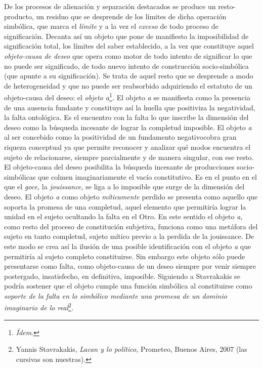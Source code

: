 De los procesos de alienación y separación destacados se produce un resto-producto, un residuo que se desprende de los límites de dicha operación simbólica, que marca el \emph{límite} y a la vez el \emph{exceso} de todo proceso de significación. Decanta así un objeto que pone de manifiesto la imposibilidad de significación total, los límites del saber establecido, a la vez que constituye aquel \emph{objeto-causa de deseo} que opera como motor de todo intento de significar lo que no puede ser significado, de todo nuevo intento de construcción socio-simbólica (que apunte a su significación). Se trata de aquel resto que se desprende a modo de heterogeneidad y que no puede ser reabsorbido adquiriendo el estatuto de un objeto-causa del deseo: el \emph{objeto a}\footnote{\emph{Ídem}.}\emph{.} El objeto \emph{a} se manifiesta como la presencia de una ausencia fundante y constituye así la huella que positiviza la negatividad, la falta ontológica. Es el encuentro con la falta lo que inscribe la dimensión del deseo como la búsqueda incesante de lograr la completud imposible. El objeto \emph{a} al ser concebido como la positividad de un fundamento negativocobra gran riqueza conceptual ya que permite reconocer y analizar qué modos encuentra el sujeto de relacionarse, siempre parcialmente y de manera singular, con ese resto. El objeto-causa del deseo posibilita la búsqueda incesante de producciones socio-simbólicas que colmen imaginariamente el vacío constitutivo. Es en el punto en el que el \emph{goce,} la \emph{jouissance,} se liga a lo imposible que surge de la dimensión del deseo. El objeto \emph{a} como objeto \emph{míticamente} perdido se presenta como aquello que soporta la promesa de una completud, aquel elemento que permitiría lograr la unidad en el sujeto ocultando la falta en el Otro. En este sentido el objeto \emph{a,} como resto del proceso de constitución subjetiva, funciona como una metáfora del sujeto en tanto completud, sujeto mítico previo a la perdida de la jouissance. De este modo se crea así la ilusión de una posible identificación con el objeto \emph{a} que permitiría al sujeto completo constituirse. Sin embargo este objeto sólo puede presentarse como falta, como objeto-causa de un deseo siempre por venir siempre postergado, insatisfecho, en definitiva, imposible. Siguiendo a Stavrakakis se podría sostener que el objeto cumple una función simbólica al constituirse como \emph{soporte de la falta en lo simbólico mediante una promesa de un dominio imaginario de lo real}\footnote{Yannis Stavrakakis, \emph{Lacan y lo político,} Prometeo, Buenos Aires, 2007 (las cursivas son nuestras).}\emph{.}

